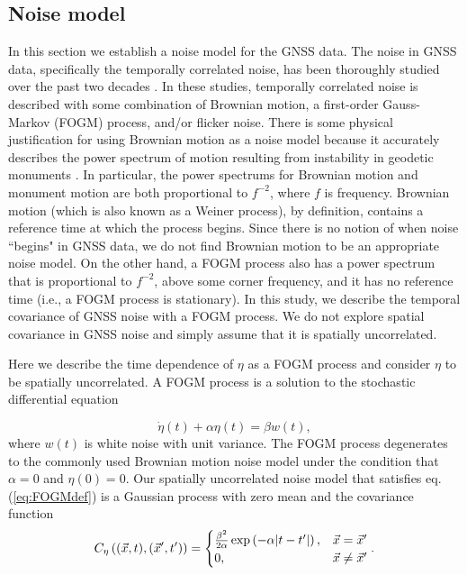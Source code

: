\documentclass[extra,mreferee]{gji}
\begin{document}
\subsection{Noise model}\label{sec:NoiseModel}


In this section we establish a noise model for the GNSS data. The
noise in GNSS data, specifically the temporally correlated noise, has
been thoroughly studied over the past two decades
\citep[e.g.,][]{Zhang1997, Mao1999, Williams2004, Langbein2008}. In
these studies, temporally correlated noise is described with some
combination of Brownian motion, a first-order Gauss-Markov (FOGM)
process, and/or flicker noise. There is some physical justification
for using Brownian motion as a noise model because it accurately
describes the power spectrum of motion resulting from instability in
geodetic monuments \citep[e.g.,][]{Wyatt1982, Wyatt1989}. In
particular, the power spectrums for Brownian motion and monument
motion are both proportional to $f^{-2}$, where $f$ is frequency.
Brownian motion (which is also known as a Weiner process), by
definition, contains a reference time at which the process begins.
Since there is no notion of when noise ``begins" in GNSS data, we do
not find Brownian motion to be an appropriate noise model. On the
other hand, a FOGM process also has a power spectrum that is
proportional to $f^{-2}$, above some corner frequency, and it has no
reference time (i.e., a FOGM process is stationary). In this study, we
describe the temporal covariance of GNSS noise with a FOGM process. We
do not explore spatial covariance in GNSS noise and simply assume that
it is spatially uncorrelated.

Here we
describe the time dependence of $\eta$ as a FOGM process and consider
$\eta$ to be spatially uncorrelated. A FOGM process is a solution to
the stochastic differential equation

\begin{equation}\label{eq:FOGMdef}
\dot{\eta}(t) + \alpha \eta(t) = \beta w(t),
\end{equation}
where $w(t)$ is white noise with unit variance. The FOGM process
degenerates to the commonly used Brownian motion noise model under the
condition that $\alpha=0$ and $\eta(0) = 0$. Our spatially
uncorrelated noise model that satisfies eq. (\ref{eq:FOGMdef}) is a
Gaussian process with zero mean and the covariance function
\begin{equation}\label{eq:FOGM}
C_\eta\left((\vec{x},t),(\vec{x}',t')\right) = 
\begin{cases}
\frac{\beta^2}{2\alpha}\exp\left(-\alpha|t - t'|\right), &\vec{x} = \vec{x}' \\
0, &\vec{x} \neq \vec{x}'
\end{cases}. 
\end{equation}
\end{document}
